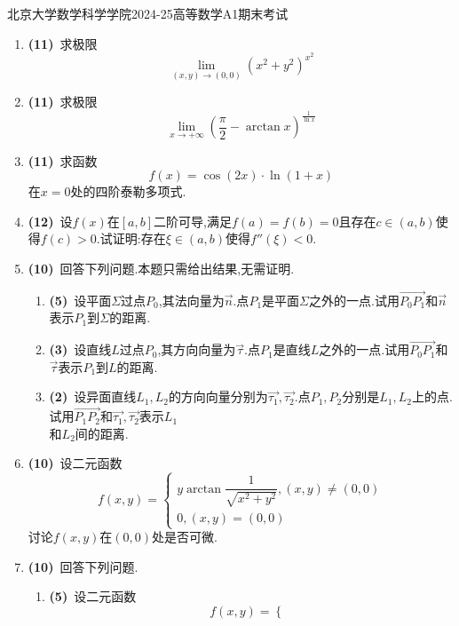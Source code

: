 \documentclass{ctexart}
\begin{document}
\pagestyle{empty}

\begin{center}\Large
    北京大学数学科学学院2024-25高等数学A1期末考试
\end{center}
\begin{enumerate}[leftmargin=*,label=\textbf{\arabic*.}]
    \item \textbf{(11)}\ 求极限\[\lim_{(x,y)\to(0,0)}\left(x^2+y^2\right)^{x^2}\]
    \item \textbf{(11)}\ 求极限\[\lim_{x\to+\infty}\left(\dfrac{\pi}{2}-\arctan x\right)^{\frac{1}{\ln x}}\]
    \item \textbf{(11)}\ 求函数\[f(x)=\cos(2x)\cdot\ln(1+x)\]在$x=0$处的四阶泰勒多项式.
    \item \textbf{(12)}\ 设$f(x)$在$[a,b]$二阶可导,满足$f(a)=f(b)=0$且存在$c\in(a,b)$使得$f(c)>0$.试证明:存在$\xi\in(a,b)$使得$f''(\xi)<0$.
    \item \textbf{(10)}\ 回答下列问题.本题只需给出结果,无需证明.
        \begin{enumerate}[label=\tbf{(\arabic*)}]
            \item \textbf{(5)}\ 设平面$\Sigma$过点$P_0$,其法向量为$\vec{n}$.点$P_1$是平面$\Sigma$之外的一点.试用$\overrightarrow{P_0P_1}$和$\vec{n}$表示$P_1$到$\Sigma$的距离.
            \item \textbf{(3)}\ 设直线$L$过点$P_0$,其方向向量为$\vec{\tau}$.点$P_1$是直线$L$之外的一点.试用$\overrightarrow{P_0P_1}$和$\vec{\tau}$表示$P_1$到$L$的距离.
            \item \textbf{(2)}\ 设异面直线$L_1,L_2$的方向向量分别为$\vec{\tau_1},\vec{\tau_2}$.点$P_1,P_2$分别是$L_1,L_2$上的点.试用$\overrightarrow{P_1P_2}$和$\vec{\tau_1},\vec{\tau_2}$表示$L_1$\\和$L_2$间的距离.
        \end{enumerate}
    \item \textbf{(10)}\ 设二元函数\[f(x,y)=\left\{\begin{array}{l}
            y\arctan\dfrac{1}{\sqrt{x^2+y^2}},(x,y)\neq(0,0)\\
            0,(x,y)=(0,0)
        \end{array}\right.\]讨论$f(x,y)$在$(0,0)$处是否可微.
    \item \textbf{(10)}\ 回答下列问题.
        \begin{enumerate}[label=\tbf{(\arabic*)}]
            \item \textbf{(5)}\ 设二元函数\[f(x,y)=\left\{\begin{array}{l}

\end{array}\]
\end{enumerate}
\end{enumerate}
\end{document}
